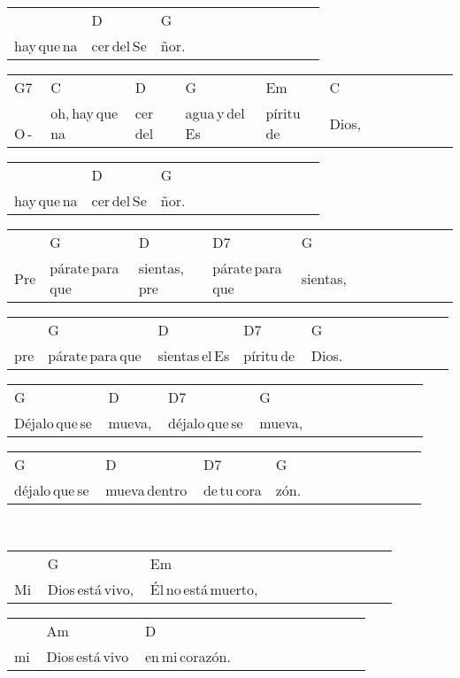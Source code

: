 \begin{multicols}{2}
\begin{minipage}{\columnwidth}
\noindent
\begin{tabular}{llllllllllll}
&D&G\\
hay\,que\,na&cer\,del\,Se&ñor.
\end{tabular}

\noindent
\begin{tabular}{llllllllllll}
G7&C&D&G&Em&C\\
\,O\,-\,&oh,\,hay\,que\,na&cer\,del\,&agua\,y\,del\,Es&píritu\,de\,&Dios,
\end{tabular}

\noindent
\begin{tabular}{llllllllllll}
&D&G\\
hay\,que\,na&cer\,del\,Se&ñor.
\end{tabular}

\noindent
\begin{tabular}{llllllllllll}
&G&D&D7&G\\
Pre&párate\,para\,que\,&sientas,\,pre&párate\,para\,que\,&sientas,
\end{tabular}

\noindent
\begin{tabular}{llllllllllll}
&G&D&D7&G\\
pre&párate\,para\,que\,&sientas\,el\,Es&píritu\,de\,&Dios.
\end{tabular}

\noindent
\begin{tabular}{llllllllllll}
G&D&D7&G\\
Déjalo\,que\,se\,&mueva,\,&déjalo\,que\,se\,&mueva,
\end{tabular}

\noindent
\begin{tabular}{llllllllllll}
G&D&D7&G\\
déjalo\,que\,se\,&mueva\,dentro\,&de\,tu\,cora&zón.
\end{tabular}
\end{minipage}\\

\noindent
\begin{minipage}{\columnwidth}
\noindent
\noindent
\begin{tabular}{llllllllllll}
&G&Em\\
Mi\,&Dios\,está\,vivo,\,&Él\,no\,está\,muerto,
\end{tabular}

\noindent
\begin{tabular}{llllllllllll}
&Am&D\\
mi\,&Dios\,está\,vivo\,&en\,mi\,corazón.
\end{tabular}


\end{minipage}
\end{multicols}
